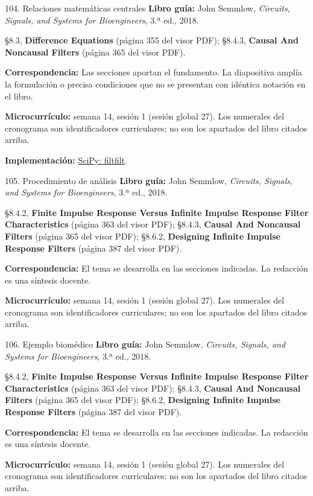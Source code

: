 \documentclass[
  10pt,
  ignorenonframetext,
  aspectratio=169,
  spanish,
]{beamer}
\begin{document}
\begin{frame}{104. Relaciones matemáticas centrales}
\label{relaciones-matemuxe1ticas-centrales-6}
\textbf{Libro guía:} John Semmlow, \emph{Circuits, Signals, and Systems
for Bioengineers}, 3.ª ed., 2018.

§8.3, \textbf{Difference Equations} (página 355 del visor PDF); §8.4.3,
\textbf{Causal And Noncausal Filters} (página 365 del visor PDF).

\textbf{Correspondencia:} Las secciones aportan el fundamento. La
diapositiva amplía la formulación o precisa condiciones que no se
presentan con idéntica notación en el libro.

\textbf{Microcurrículo:} semana 14, sesión 1 (sesión global 27). Los
numerales del cronograma son identificadores curriculares; no son los
apartados del libro citados arriba.

\textbf{Implementación:}
\href{https://docs.scipy.org/doc/scipy/reference/generated/scipy.signal.filtfilt.html}{SciPy:
filtfilt}.
\end{frame}

\begin{frame}{105. Procedimiento de análisis}
\label{procedimiento-de-anuxe1lisis-6}
\textbf{Libro guía:} John Semmlow, \emph{Circuits, Signals, and Systems
for Bioengineers}, 3.ª ed., 2018.

§8.4.2, \textbf{Finite Impulse Response Versus Infinite Impulse Response
Filter Characteristics} (página 363 del visor PDF); §8.4.3,
\textbf{Causal And Noncausal Filters} (página 365 del visor PDF);
§8.6.2, \textbf{Designing Infinite Impulse Response Filters} (página 387
del visor PDF).

\textbf{Correspondencia:} El tema se desarrolla en las secciones
indicadas. La redacción es una síntesis docente.

\textbf{Microcurrículo:} semana 14, sesión 1 (sesión global 27). Los
numerales del cronograma son identificadores curriculares; no son los
apartados del libro citados arriba.
\end{frame}

\begin{frame}{106. Ejemplo biomédico}
\label{ejemplo-biomuxe9dico-6}
\textbf{Libro guía:} John Semmlow, \emph{Circuits, Signals, and Systems
for Bioengineers}, 3.ª ed., 2018.

§8.4.2, \textbf{Finite Impulse Response Versus Infinite Impulse Response
Filter Characteristics} (página 363 del visor PDF); §8.4.3,
\textbf{Causal And Noncausal Filters} (página 365 del visor PDF);
§8.6.2, \textbf{Designing Infinite Impulse Response Filters} (página 387
del visor PDF).

\textbf{Correspondencia:} El tema se desarrolla en las secciones
indicadas. La redacción es una síntesis docente.

\textbf{Microcurrículo:} semana 14, sesión 1 (sesión global 27). Los
numerales del cronograma son identificadores curriculares; no son los
apartados del libro citados arriba.
\end{frame}
\end{document}
